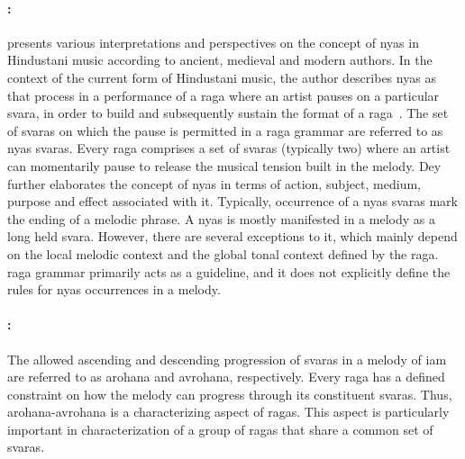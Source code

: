 \paragraph{:} \cite{Dey2008} presents various interpretations and perspectives on the concept of \gls{nyas} in Hindustani music according to ancient, medieval and modern authors. In the context of the current form of Hindustani music, the author describes \gls{nyas} as that process in a performance of a \gls{raga} where an artist pauses on a particular \gls{svara}, in order to build and subsequently sustain the format of a \gls{raga}~\citep[p. 70]{Dey2008}. The set of \glspl{svara} on which the pause is permitted in a \gls{raga} grammar are referred to as \gls{nyas} \glspl{svara}. Every \gls{raga} comprises a set of \glspl{svara} (typically two) where an artist can momentarily pause to release the musical tension built in the melody. Dey further elaborates the concept of \gls{nyas} in terms of action, subject, medium, purpose and effect associated with it. Typically, occurrence of a \gls{nyas} \glspl{svara} mark the ending of a melodic phrase. A \gls{nyas} is mostly manifested in a melody as a long held \gls{svara}. However, there are several exceptions to it, which mainly depend on the local melodic context and the global tonal context defined by the \gls{raga}. \Gls{raga} grammar primarily acts as a guideline, and it does not explicitly define the rules for \gls{nyas} occurrences in a melody. 

\paragraph{:}

The allowed ascending and descending progression of \glspl{svara} in a melody of \gls{iam} are referred to as \gls{arohana} and \gls{avrohana}, respectively. Every \gls{raga} has a defined constraint on how the melody can progress through its constituent \glspl{svara}. Thus, \gls{arohana}-\gls{avrohana} is a characterizing aspect of \glspl{raga}. This aspect is particularly important in characterization of a group of \glspl{raga} that share a common set of \glspl{svara}. 

